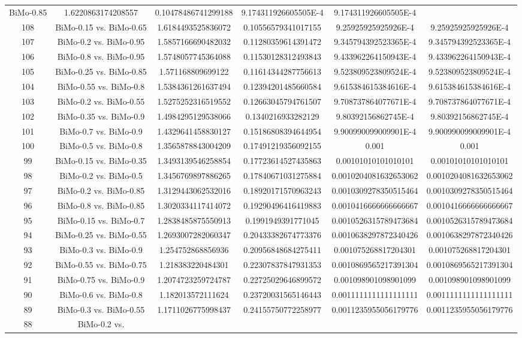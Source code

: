 \documentclass[a4paper,10pt]{article}
\begin{document}
\begin{landscape}
\begin{table}[!htp]
\begin{tabular}{cccccc}
BiMo-0.85&1.6220863174208557&0.10478486741299188&9.174311926605505E-4&9.174311926605505E-4\\108&BiMo-0.15 vs. BiMo-0.65&1.6184493525836072&0.10556579341017155&9.25925925925926E-4&9.25925925925926E-4\\107&BiMo-0.2 vs. BiMo-0.95&1.5857166690482032&0.11280359614391472&9.345794392523365E-4&9.345794392523365E-4\\106&BiMo-0.8 vs. BiMo-0.95&1.5748057745364088&0.11530128312493843&9.433962264150943E-4&9.433962264150943E-4\\105&BiMo-0.25 vs. BiMo-0.85&1.571168809699122&0.11614344287756613&9.523809523809524E-4&9.523809523809524E-4\\104&BiMo-0.55 vs. BiMo-0.8&1.5384361261637494&0.12394201485660584&9.615384615384616E-4&9.615384615384616E-4\\103&BiMo-0.2 vs. BiMo-0.55&1.5275252316519552&0.12663045794761507&9.708737864077671E-4&9.708737864077671E-4\\102&BiMo-0.35 vs. BiMo-0.9&1.4984295129538066&0.1340216933282129&9.80392156862745E-4&9.80392156862745E-4\\101&BiMo-0.7 vs. BiMo-0.9&1.4329641458830127&0.15186808394644954&9.900990099009901E-4&9.900990099009901E-4\\100&BiMo-0.5 vs. BiMo-0.8&1.3565878843004209&0.17491219356092155&0.001&0.001\\99&BiMo-0.15 vs. BiMo-0.35&1.3493139546258854&0.17723614527435863&0.00101010101010101&0.00101010101010101\\98&BiMo-0.2 vs. BiMo-0.5&1.3456769897886265&0.17840671031275884&0.0010204081632653062&0.0010204081632653062\\97&BiMo-0.2 vs. BiMo-0.85&1.3129443062532016&0.18920171570963243&0.0010309278350515464&0.0010309278350515464\\96&BiMo-0.8 vs. BiMo-0.85&1.3020334117414072&0.19290496416419883&0.0010416666666666667&0.0010416666666666667\\95&BiMo-0.15 vs. BiMo-0.7&1.2838485875550913&0.1991949391771045&0.0010526315789473684&0.0010526315789473684\\94&BiMo-0.25 vs. BiMo-0.55&1.2693007282060347&0.20433382674773376&0.0010638297872340426&0.0010638297872340426\\93&BiMo-0.3 vs. BiMo-0.9&1.254752868856936&0.20956848684275411&0.001075268817204301&0.001075268817204301\\92&BiMo-0.55 vs. BiMo-0.75&1.218383220484301&0.22307837847931353&0.0010869565217391304&0.0010869565217391304\\91&BiMo-0.75 vs. BiMo-0.9&1.2074723259724787&0.22725029646899572&0.001098901098901099&0.001098901098901099\\90&BiMo-0.6 vs. BiMo-0.8&1.182013572111624&0.23720031565146443&0.0011111111111111111&0.0011111111111111111\\89&BiMo-0.3 vs. BiMo-0.55&1.1711026775998437&0.24155750772258977&0.0011235955056179776&0.0011235955056179776\\88&BiMo-0.2 vs. 
\end{tabular}
\end{table}
\end{landscape}
\end{document}
